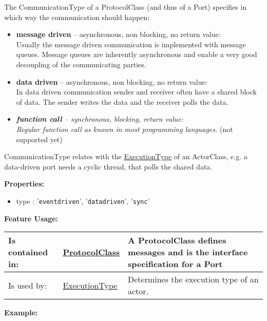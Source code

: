 	The CommunicationType of a ProtocolClass (and thus of a Port) specifies in which way the communication should happen:
	
	\begin{itemize}
	\item \textbf{message driven} -- asynchronous, non blocking, no return value:\\
	Usually the message driven communication is implemented with message queues. Message queues are inherently asynchronous and enable a very good decoupling of the communicating parties.
	\item \textbf{data driven} -- asynchronous, non blocking, no return value:\\
	In data driven communication sender and receiver often have a shared block of data. The sender writes the data and the receiver polls the data.
	\item \textit{\textbf{function call} -- synchronous, blocking, return value:\\
	Regular function call as known in most programming languages.} (not supported yet)
	\end{itemize}
	
	CommunicationType relates with the \hyperlink{ref:ExecutionType}{ExecutionType} of an ActorClass, e.g. a data-driven port needs a cyclic thread, that polls the shared data.
		
	\textbf{Properties:}
	\begin{itemize}
	\item type : '\verb|eventdriven|', '\verb|datadriven|', '\verb|sync|'
	\end{itemize}
		
		
	\begingroup
	\textbf{Feature Usage:}
	\renewcommand{\arraystretch}{1.8} %
	\begin{longtable}{l|l p{}}
		\hline
	Is contained in: & \tabitem \hyperlink{ref:ProtocolClass}{ProtocolClass}  & A ProtocolClass defines messages and is the interface specification for a Port\\
	\hline
	Is used by: & \tabitem \hyperlink{ref:ExecutionType}{ExecutionType}  & Determines the execution type of an actor.\\
	\hline
	\end{longtable}
	\endgroup
		
	\textbf{Example:}
	
